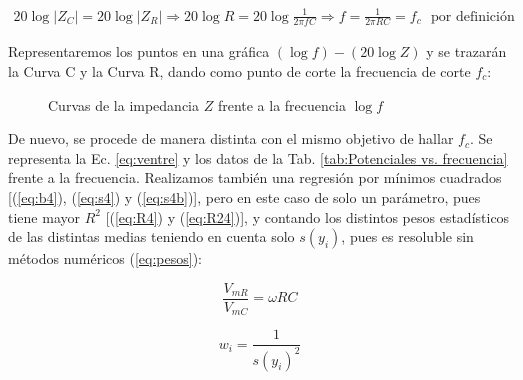 \documentclass[11pt]{report}
\begin{document}
\begin{refsection}
\begin{center}
\begin{equation}
\begin{split}
    20\log|Z_C|= 20\log |Z_R|\Rightarrow 20\log R = 20\log \frac{1}{2\pi f C} \Rightarrow f=\frac{1}{2\pi R C}=f_c \hspace{8pt}\text{por definición}
\end{split}
\end{equation}
\end{center}

Representaremos los puntos en una gráfica
$(\log f) - (20\log Z)$ y se trazarán la Curva C y la Curva R, dando como punto de corte la frecuencia de corte $f_c$:

\begin{figure}[H]
    \begin{center}
        
    \end{center}
    \caption{Curvas de la impedancia $Z$ frente a la frecuencia $\log f$}
    \label{fig:curvaRC}
\end{figure}

De nuevo, se procede de manera distinta con el mismo objetivo de hallar $f_c$. Se representa la Ec. \ref{eq:ventre} y los datos de 
la Tab. \ref{tab:Potenciales vs. frecuencia} frente a la frecuencia. Realizamos también una regresión por mínimos cuadrados [(\ref{eq:b4}), (\ref{eq:s4})
y (\ref{eq:s4b})], pero en
este caso de solo un parámetro, pues tiene mayor $R^2$ [(\ref{eq:R4}) y (\ref{eq:R24})], y contando los distintos pesos estadísticos
de las distintas medias teniendo en cuenta solo $s(y_i)$, pues es resoluble sin métodos numéricos (\ref{eq:pesos}):

\begin{equation}
    \frac{V_{mR}}{V_{mC}}=\omega R C
    \label{eq:ventre}
\end{equation}

\begin{equation}
    w_i=\frac{1}{s(y_i)^2}
    \label{eq:pesos}
\end{equation}


\end{refsection}
\end{document}
